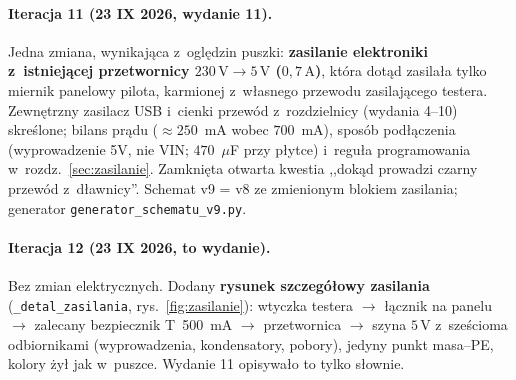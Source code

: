 \documentclass[a4paper,11pt]{article}
\newcommand{\volt}{\,\mathrm{V}}
\newcommand{\amp}{\,\mathrm{A}}
\begin{document}
\paragraph{Iteracja 11 (23 IX 2026, wydanie 11).} Jedna zmiana, wynikająca z~oględzin
puszki: \textbf{zasilanie elektroniki z~istniejącej przetwornicy $230\volt\to5\volt$
($0{,}7\amp$)}, która dotąd zasilała tylko miernik panelowy pilota, karmionej
z~własnego przewodu zasilającego testera. Zewnętrzny zasilacz USB i~cienki przewód
z~rozdzielnicy (wydania 4--10) skreślone; bilans prądu ($\approx250$~mA wobec
$700$~mA), sposób podłączenia (wyprowadzenie 5V, nie VIN; $470$~$\mu$F przy
płytce) i~reguła programowania w~rozdz.~\ref{sec:zasilanie}. Zamknięta otwarta
kwestia ,,dokąd prowadzi czarny przewód z~dławnicy''. Schemat v9 = v8 ze zmienionym
blokiem zasilania; generator \texttt{generator\_schematu\_v9.py}.

\paragraph{Iteracja 12 (23 IX 2026, to wydanie).} Bez zmian elektrycznych. Dodany
\textbf{rysunek szczegółowy zasilania} (\texttt{\_detal\_zasilania}, rys.~\ref{fig:zasilanie}):
wtyczka testera $\to$ łącznik na panelu $\to$ zalecany bezpiecznik T~500~mA $\to$
przetwornica $\to$ szyna $5\volt$ z~sześcioma odbiornikami (wyprowadzenia, kondensatory,
pobory), jedyny punkt masa--PE, kolory żył jak w~puszce. Wydanie 11 opisywało to tylko
słownie.
\end{document}
